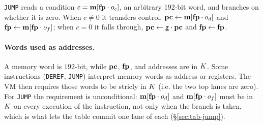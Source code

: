 \texttt{JUMP} reads a condition $c=\mathbf{m}[\mathbf{fp}\cdot o_c]$, an arbitrary $192$-bit word, and branches on whether it is zero. When $c\neq0$ it transfers control, $\mathbf{pc}\gets\mathbf{m}[\mathbf{fp}\cdot o_d]$ and $\mathbf{fp}\gets\mathbf{m}[\mathbf{fp}\cdot o_f]$; when $c=0$ it falls through, $\mathbf{pc}\gets\mathsf{g}\cdot\mathbf{pc}$ and $\mathbf{fp}\gets\mathbf{fp}$.

\paragraph{Words used as addresses.} A memory word is $192$-bit, while $\mathbf{pc}$, $\mathbf{fp}$, and addresses are in $K$. Some instructions (\texttt{DEREF}, \texttt{JUMP}) interpret memory words as address or registers. The VM then requires those words to be stricly in $K$ (i.e. the two top lanes are zero). For \texttt{JUMP} the requirement is unconditional: $\mathbf{m}[\mathbf{fp}\cdot o_d]$ and $\mathbf{m}[\mathbf{fp}\cdot o_f]$ must be in $K$ on every execution of the instruction, not only when the branch is taken, which is what lets the table commit one lane of each (\S\ref{sec:tab-jump}).


